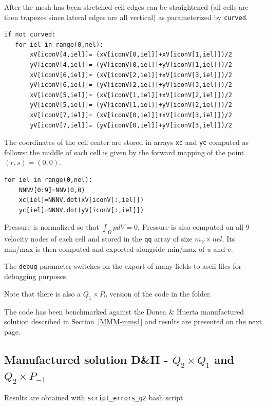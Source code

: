 After the mesh has been stretched cell edges can be straightened (all cells are then 
trapezes since lateral edges are all vertical) as parameterized by \lstinline{curved}.  
\begin{lstlisting}
if not curved: 
   for iel in range(0,nel):
       xV[iconV[4,iel]]= (xV[iconV[0,iel]]+xV[iconV[1,iel]])/2
       yV[iconV[4,iel]]= (yV[iconV[0,iel]]+yV[iconV[1,iel]])/2
       xV[iconV[6,iel]]= (xV[iconV[2,iel]]+xV[iconV[3,iel]])/2
       yV[iconV[6,iel]]= (yV[iconV[2,iel]]+yV[iconV[3,iel]])/2
       xV[iconV[5,iel]]= (xV[iconV[1,iel]]+xV[iconV[2,iel]])/2
       yV[iconV[5,iel]]= (yV[iconV[1,iel]]+yV[iconV[2,iel]])/2
       xV[iconV[7,iel]]= (xV[iconV[0,iel]]+xV[iconV[3,iel]])/2
       yV[iconV[7,iel]]= (yV[iconV[0,iel]]+yV[iconV[3,iel]])/2
\end{lstlisting}

The coordinates of the cell center are stored in arrays \lstinline{xc} and \lstinline{yc}
computed as follows: the middle of each cell is given by the forward mapping of the 
point $(r,s)=(0,0)$.
\begin{lstlisting}
for iel in range(0,nel):
    NNNV[0:9]=NNV(0,0)
    xc[iel]=NNNV.dot(xV[iconV[:,iel]])
    yc[iel]=NNNV.dot(yV[iconV[:,iel]])
\end{lstlisting}

Pressure is normalized so that $\int_\Omega p dV= 0$.
Pressure is also computed on all 9 velocity nodes of each cell and stored in 
the \lstinline{qq} array of size $m_V \times nel$. Its min/max is then computed and 
exported alongside min/max of $u$ and $v$.

The \lstinline{debug} parameter switches on the export of many fields to ascii files 
for debugging purposes.

Note that there is also a $Q_1\times P_0$ version of the code in the folder.

The code has been benchmarked against the Donea \& Huerta manufactured solution 
described in Section~\ref{MMM-mms1} and results are presented on the next page.

\newpage
\subsection*{Manufactured solution D\&H - $Q_2\times Q_1$ and $Q_2\times P_{-1}$}

Results are obtained with {\tt script\_errors\_q2} bash script.

